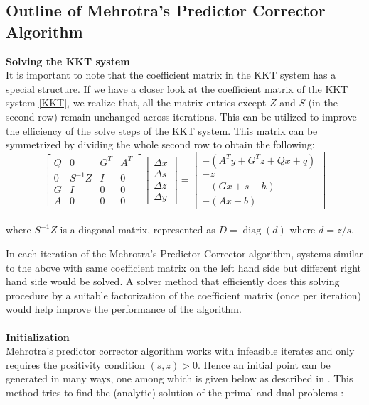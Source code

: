 \subsection{Outline of Mehrotra's Predictor Corrector Algorithm}
\textbf{Solving the KKT system}\\
It is important to note that the coefficient matrix in the KKT system has a special structure. If we have a closer look at the coefficient matrix of the KKT system \ref{KKT}, we realize that, all the matrix entries except $Z$ and $S$ (in the second row) remain unchanged across iterations. This can be utilized to improve the efficiency of the solve steps of the KKT system. This matrix can be symmetrized by dividing the whole second row to obtain the following:
\begin{equation} \label{KKT_sym}
\left[\begin{array}{cc|cc}Q & 0 & G^{T} & A^{T} \\ 0 & S^{-1}Z & I & 0 \\\hline G & I & 0 & 0 \\ A & 0 & 0 & 0\end{array}\right]\left[\begin{array}{c}\Delta x \\ \Delta s \\ \Delta z \\ \Delta y\end{array}\right]=\left[\begin{array}{c}-\left(A^{T} y+G^{T} z+Q x+q\right) \\ - z \\ -(G x+s-h) \\ -(A x-b)\end{array}\right]
\end{equation}\\
where $S^{-1}Z$ is a diagonal matrix, represented as $D=\operatorname{diag}(d)$ where $d=z/s$.\par
In each iteration of the Mehrotra's Predictor-Corrector algorithm, systems similar to the above with same coefficient matrix on the left hand side but different right hand side would be solved. A solver method that efficiently does this solving procedure by a suitable factorization of the coefficient matrix (once per iteration) would help improve the performance of the algorithm.\\ \\
\textbf{Initialization}\\
Mehrotra's predictor corrector algorithm works with infeasible iterates and only requires the positivity condition $(s,z)>0$. Hence an initial point can be generated in many ways, one among which is given below as described in \cite{vandenberghe2010cvxopt}. This method tries to find the (analytic) solution of the primal and dual problems :
